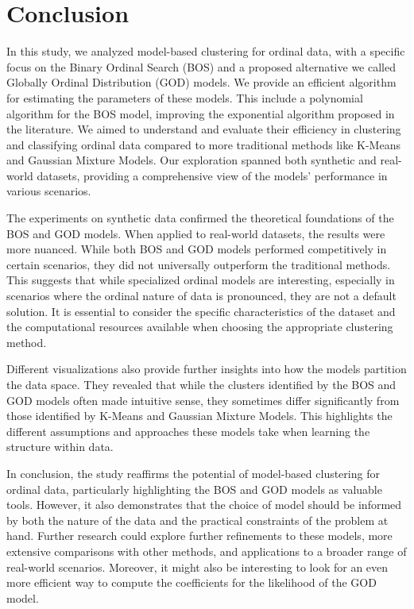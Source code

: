 \section{Conclusion}
In this study, we analyzed model-based clustering for ordinal data, with a specific focus on the Binary Ordinal Search (BOS) and a proposed alternative we called Globally Ordinal Distribution (GOD) models.
We provide an efficient algorithm for estimating the parameters of these models. This include a polynomial algorithm for the BOS model, improving the exponential algorithm proposed in the literature.
We aimed to understand and evaluate their efficiency in clustering and classifying ordinal data compared to more traditional methods like K-Means and Gaussian Mixture Models. Our exploration spanned both synthetic and real-world datasets, providing a comprehensive view of the models' performance in various scenarios.

The experiments on synthetic data confirmed the theoretical foundations of the BOS and GOD models. 
When applied to real-world datasets, the results were more nuanced. While both BOS and GOD models performed competitively in certain scenarios, they did not universally outperform the traditional methods. This suggests that while specialized ordinal models are interesting, especially in scenarios where the ordinal nature of data is pronounced, they are not a default solution. It is essential to consider the specific characteristics of the dataset and the computational resources available when choosing the appropriate clustering method.

Different visualizations also provide further insights into how the models partition the data space. They revealed that while the clusters identified by the BOS and GOD models often made intuitive sense, they sometimes differ significantly from those identified by K-Means and Gaussian Mixture Models. This highlights the different assumptions and approaches these models take when learning the structure within data.

In conclusion, the study reaffirms the potential of model-based clustering for ordinal data, particularly highlighting the BOS and GOD models as valuable tools. However, it also demonstrates that the choice of model should be informed by both the nature of the data and the practical constraints of the problem at hand. Further research could explore further refinements to these models, more extensive comparisons with other methods, and applications to a broader range of real-world scenarios. Moreover, it might also be interesting to look for an even more efficient way to compute the coefficients for the likelihood of the GOD model.
